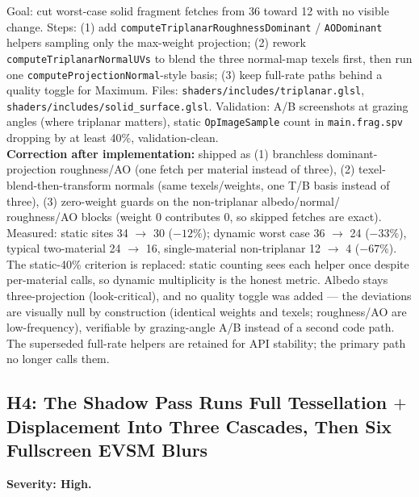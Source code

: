 \documentclass[11pt,a4paper]{article}
\begin{document}
\begin{tcolorbox}[promptbox={Prompt --- C3: collapse the triplanar fetch fan-out}]
Goal: cut worst-case solid fragment fetches from 36 toward 12 with no visible
change. Steps: (1) add \texttt{computeTriplanarRoughnessDominant} /
\texttt{AODominant} helpers sampling only the max-weight projection;
(2) rework \texttt{computeTriplanarNormalUVs} to blend the three normal-map
texels first, then run one \texttt{computeProjectionNormal}-style basis;
(3) keep full-rate paths behind a quality toggle for Maximum. Files:
\texttt{shaders/includes/triplanar.glsl},
\texttt{shaders/includes/solid\_surface.glsl}. Validation: A/B screenshots at
grazing angles (where triplanar matters), static \texttt{OpImageSample} count
in \texttt{main.frag.spv} dropping by at least 40\%, validation-clean.
\\ \textbf{Correction after implementation:} shipped as (1) branchless
dominant-projection roughness/AO (one fetch per material instead of three),
(2) texel-blend-then-transform normals (same texels/weights, one T/B basis
instead of three), (3) zero-weight guards on the non-triplanar albedo/normal/
roughness/AO blocks (weight 0 contributes 0, so skipped fetches are exact).
Measured: static sites 34 $\rightarrow$ 30 ($-12\%$); dynamic worst case
36 $\rightarrow$ 24 ($-33\%$), typical two-material 24 $\rightarrow$ 16,
single-material non-triplanar 12 $\rightarrow$ 4 ($-67\%$). The static-40\%
criterion is replaced: static counting sees each helper once despite
per-material calls, so dynamic multiplicity is the honest metric. Albedo stays
three-projection (look-critical), and no quality toggle was added --- the
deviations are visually null by construction (identical weights and texels;
roughness/AO are low-frequency), verifiable by grazing-angle A/B instead of a
second code path. The superseded full-rate helpers are retained for API
stability; the primary path no longer calls them.
\end{tcolorbox}

\subsection{H4: The Shadow Pass Runs Full Tessellation $+$ Displacement Into Three Cascades, Then Six Fullscreen EVSM Blurs}
\label{sec:h4}

\textbf{Severity: High.}
\end{document}
